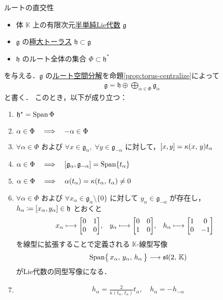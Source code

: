 \documentclass[rep_main]{subfiles}
\begin{document}
\begin{myprop}[label=prop:root-decomp-ortho,breakable]{ルートの直交性}
	\begin{itemize}
		\item 体 $\mathbb{K}$ 上の有限次元\hyperref[def:semisimple-LieAlg]{半単純Lie代数} $\mathfrak{g}$
		\item $\mathfrak{g}$ の\hyperref[def:toral-subLieAlg]{極大トーラス} $\mathfrak{h} \subset \mathfrak{g}$
		\item $\mathfrak{h}$ のルート全体の集合 $\Phi \subset \mathfrak{h}^*$ 
	\end{itemize}
	を与える．$\mathfrak{g}$ の\hyperref[eq:root-decomp]{ルート空間分解}を命題\ref{prop:torus-centralize}によって
	\begin{align}
		\mathfrak{g} = \mathfrak{h} \oplus \bigoplus_{\alpha \in \Phi} \mathfrak{g}_\alpha
	\end{align}
	と書く．
	このとき，以下が成り立つ：
	\begin{enumerate}
		\item $\mathfrak{h}^* = \operatorname{Span} \Phi$
		\item $\alpha \in \Phi \quad \Longrightarrow \quad -\alpha \in \Phi$
		\item $\forall \alpha \in \Phi$ および $\forall x \in \mathfrak{g}_\alpha,\; \forall y \in \mathfrak{g}_{-\alpha}$ に対して，$\comm{x}{y} = \kappa(x,\, y) t_\alpha$
		\item $\alpha \in \Phi \IMP \comm{\mathfrak{g}_\alpha}{\mathfrak{g}_{-\alpha}} = \Span \{t_\alpha\}$
		\item $\alpha \in \Phi \quad \Longrightarrow \quad \alpha(t_\alpha) = \kappa(t_\alpha,\, t_\alpha) \neq 0$
		\item $\forall \alpha \in \Phi$ および $\forall x_\alpha \in \mathfrak{g}_\alpha \setminus \{0\}$ に対して $y_\alpha \in \mathfrak{g}_{-\alpha}$ が存在し，$h_\alpha \coloneqq \comm{x_\alpha}{y_\alpha} \in \mathfrak{h}$ とおくと
		\begin{align}
			x_\alpha &\lmto \mqty[0 & 1 \\ 0 & 0], & y_\alpha &\lmto \mqty[0 & 0 \\ 1 & 0], & h_\alpha &\lmto \mqty[1 & 0 \\ 0 & -1]
		\end{align}
		を線型に拡張することで定義される $\mathbb{K}$-線型写像
		\begin{align}
			\operatorname{Span} \bigl\{\, x_\alpha,\, y_\alpha,\, h_\alpha\,\bigr\} \longrightarrow \mathfrak{sl}(2,\, \mathbb{K})
		\end{align}
		がLie代数の同型写像になる．
		\item 
		\begin{align}
			h_\alpha = \frac{2}{\kappa(t_\alpha,\, t_\alpha)} t_\alpha,\quad h_\alpha = - h_{-\alpha}
		\end{align}
	\end{enumerate}
	
\end{myprop}
\end{document}
